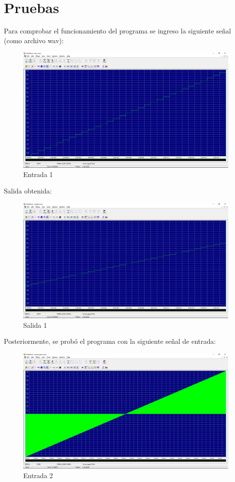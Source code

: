 \section{Pruebas}
Para comprobar el funcionamiento del programa se ingreso la siguiente señal (como archivo wav):
\begin{figure}[H]
	\centering
	\includegraphics[scale=.3]{img/prueba1.png}
	\caption{Entrada 1}
	\label{fig:prueba1}		
\end{figure}
Salida obtenida:
\begin{figure}[H]
	\centering
	\includegraphics[scale=.3]{img/salida1.png}
	\caption{Salida 1}
	\label{fig:salida1}		
\end{figure}
Posteriormente, se probó el programa con la siguiente señal de entrada:
\begin{figure}[H]
	\centering
	\includegraphics[scale=.3]{img/prueba2.png}
	\caption{Entrada 2}
	\label{fig:prueba2}		
\end{figure}
